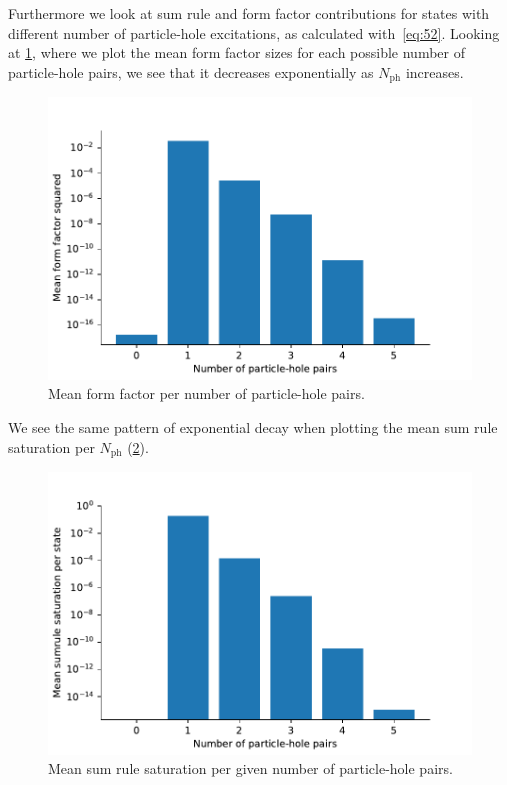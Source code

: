 \documentclass[11pt, a4paper]{report} %
\begin{document}
Furthermore we look at sum rule and form factor contributions for states with different number of particle-hole excitations, as calculated with~\cref{eq:52}.
Looking at \cref{fig:meanffphpairs}, where we plot the mean form factor sizes for each possible number of particle-hole pairs, we see that it decreases exponentially as \(N_{\mathrm{ph}}\) increases.
\begin{figure}[tb!]
  \centering
  \includegraphics[width=.7\textwidth]{ave_form_factor_ph_pairs.pdf}
  \caption{Mean form factor per number of particle-hole pairs.}
  \label{fig:meanffphpairs}
\end{figure}

We see the same pattern of exponential decay when plotting the mean sum rule saturation per \(N_{\mathrm{ph}}\) (\cref{fig:meansumrulesaturation}). 
\begin{figure}[tb!]
  \centering
  \includegraphics[width=.7\textwidth]{ave_sum_rule_saturation_ph_pairs.pdf}
  \caption{Mean sum rule saturation per given number of particle-hole pairs.}
  \label{fig:meansumrulesaturation}
\end{figure}
\end{document}
